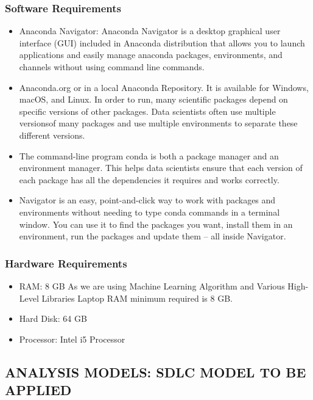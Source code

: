 \documentclass[12pt]{report}
\begin{document}
\subsubsection{Software Requirements}


\normalsize\begin{itemize}\item   Anaconda Navigator: Anaconda Navigator is a desktop graphical user interface 
(GUI) included in Anaconda distribution that allows you to launch applications and 
easily manage anaconda packages, environments, and channels without using
command line commands.
\item Anaconda.org or in a local Anaconda Repository. It is available for Windows,
macOS, and Linux. In order to run, many scientific packages depend on specific
versions of other packages. Data scientists often use multiple versionsof many 
packages and use multiple environments to separate these different versions.
\item  The command-line program conda is both a package manager and an environment 
manager. This helps data scientists ensure that each version of each package has all
the dependencies it requires and works correctly.
\item  Navigator is an easy, point-and-click way to work with packages and environments 
without needing to type conda commands in a terminal window. You can use it to 
find the packages you want, install them in an environment, run the packages and
update them – all inside Navigator.

\end{itemize}
\subsubsection{Hardware Requirements}

\normalsize\begin{itemize}\item  RAM: 8 GB
As we are using Machine Learning Algorithm and Various High-Level Libraries
Laptop RAM minimum required is 8 GB.

\item Hard Disk: 64 GB
\item Processor: Intel i5 Processor

\end{itemize}
\centering
\raggedright
\subsection{  ANALYSIS MODELS: SDLC MODEL TO BE APPLIED}
\end{document}

